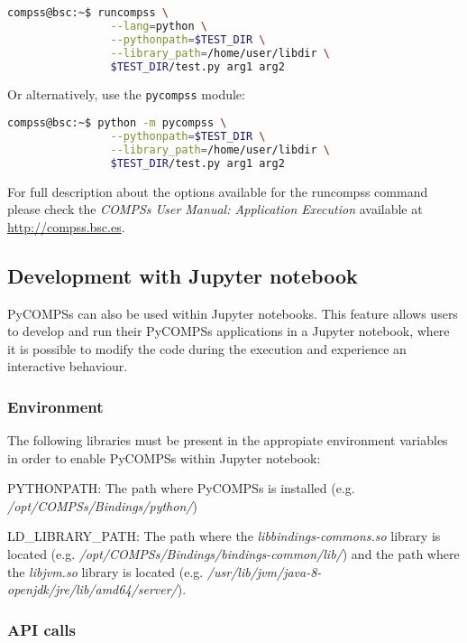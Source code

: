\begin{lstlisting}[language=bash]
compss@bsc:~$ runcompss \
                --lang=python \
                --pythonpath=$TEST_DIR \
                --library_path=/home/user/libdir \
                $TEST_DIR/test.py arg1 arg2
\end{lstlisting}

Or alternatively, use the \verb|pycompss| module:

\begin{lstlisting}[language=bash]
compss@bsc:~$ python -m pycompss \
                --pythonpath=$TEST_DIR \
                --library_path=/home/user/libdir \
                $TEST_DIR/test.py arg1 arg2
\end{lstlisting}

For full description about the options available for the runcompss command please check the \textit{COMPSs User Manual: Application
Execution} available at \url{http://compss.bsc.es}. 

\subsection{Development with Jupyter notebook}

PyCOMPSs can also be used within Jupyter notebooks. 
This feature allows users to develop and run their PyCOMPSs applications in a Jupyter notebook, where it is possible to modify the code during the execution and experience an interactive behaviour.

\subsubsection{Environment}
The following libraries must be present in the appropiate environment variables in order to enable PyCOMPSs within Jupyter notebook:

PYTHONPATH: The path where PyCOMPSs is installed (e.g. \textit{/opt/COMPSs/Bindings/python/})

LD\_LIBRARY\_PATH: The path where the {\it libbindings-commons.so} library is located (e.g. \textit{/opt/COMPSs/Bindings/bindings-common/lib/}) and the path where the {\it libjvm.so} library is located (e.g. \textit{/usr/lib/jvm/java-8-openjdk/jre/lib/amd64/server/}).

\subsubsection{API calls}


